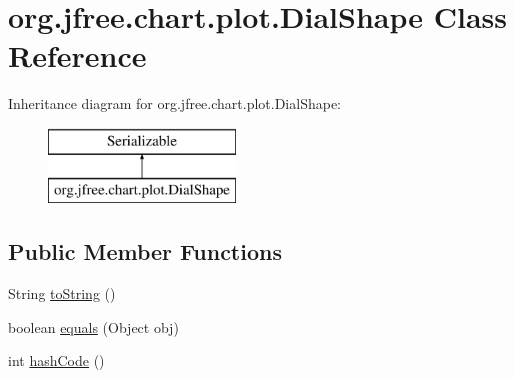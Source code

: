 \hypertarget{classorg_1_1jfree_1_1chart_1_1plot_1_1_dial_shape}{}\section{org.\+jfree.\+chart.\+plot.\+Dial\+Shape Class Reference}
\label{classorg_1_1jfree_1_1chart_1_1plot_1_1_dial_shape}
Inheritance diagram for org.\+jfree.\+chart.\+plot.\+Dial\+Shape\+:\begin{figure}[H]
\begin{center}
\leavevmode
\includegraphics[height=2.000000cm]{classorg_1_1jfree_1_1chart_1_1plot_1_1_dial_shape}
\end{center}
\end{figure}
\subsection*{Public Member Functions}
\begin{DoxyCompactItemize}
\item 
String \mbox{\hyperlink{classorg_1_1jfree_1_1chart_1_1plot_1_1_dial_shape_ae97e57f7edc16c4bf8ca48147f97d4c2}{to\+String}} ()
\item 
boolean \mbox{\hyperlink{classorg_1_1jfree_1_1chart_1_1plot_1_1_dial_shape_a04392abff5278a3b98a4fa653501a6e0}{equals}} (Object obj)
\item 
int \mbox{\hyperlink{classorg_1_1jfree_1_1chart_1_1plot_1_1_dial_shape_ad75f917a86f7316d7bf690ece704bc3b}{hash\+Code}} ()
\end{DoxyCompactItemize}
